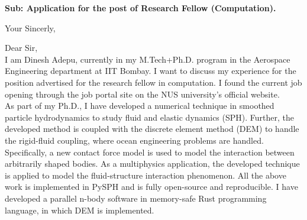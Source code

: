 \documentclass[11pt,a4paper,roman]{moderncv}
\begin{document}
\date{\today}
\opening{\textbf{Sub: Application for the post of Research Fellow (Computation).}}
\closing{Your Sincerly, \vspace{-1em}}


\makelettertitle



Dear Sir,
\\
\vspace{1em} I am Dinesh Adepu, currently in my M.Tech+Ph.D. program in the
Aerospace Engineering department at IIT Bombay. I want to discuss my experience
for the position advertised for the research fellow in computation. I found the current job opening
through the job portal site on the NUS university's official website.\\

\vspace{1em} As part of my Ph.D., I have developed a numerical technique in
smoothed particle hydrodynamics to study fluid and elastic dynamics (SPH). Further,
the developed method is coupled with the discrete element method (DEM) to handle the
rigid-fluid coupling, where ocean engineering problems are handled.
Specifically, a new contact force model is used to model the interaction between
arbitrarily shaped bodies. As a multiphysics application, the developed
technique is applied to model the fluid-structure interaction phenomenon. All
the above work is implemented in PySPH and is fully open-source and
reproducible. I have developed a parallel n-body software in memory-safe Rust
programming language, in which DEM is implemented.\\
\end{document}
